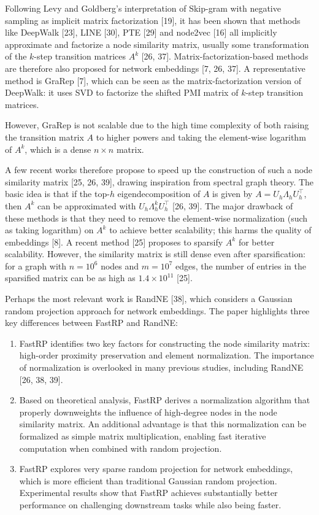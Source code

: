 \documentclass[11pt]{article}
\begin{document}
Following Levy and Goldberg's interpretation of Skip-gram with negative sampling as implicit matrix factorization [19], it has been shown that methods like DeepWalk [23], LINE [30], PTE [29] and node2vec [16] all implicitly approximate and factorize a node similarity matrix, usually some transformation of the $k$-step transition matrices $A^k$ [26, 37]. Matrix-factorization-based methods are therefore also proposed for network embeddings [7, 26, 37]. A representative method is GraRep [7], which can be seen as the matrix-factorization version of DeepWalk: it uses SVD to factorize the shifted PMI matrix of $k$-step transition matrices.

However, GraRep is not scalable due to the high time complexity of both raising the transition matrix $A$ to higher powers and taking the element-wise logarithm of $A^k$, which is a dense $n \times n$ matrix.

A few recent works therefore propose to speed up the construction of such a node similarity matrix [25, 26, 39], drawing inspiration from spectral graph theory. The basic idea is that if the top-$h$ eigendecomposition of $A$ is given by $A = U_h \Lambda_h U_h^\top$, then $A^k$ can be approximated with $U_h \Lambda_h^k U_h^\top$ [26, 39]. The major drawback of these methods is that they need to remove the element-wise normalization (such as taking logarithm) on $A^k$ to achieve better scalability; this harms the quality of embeddings [8]. A recent method [25] proposes to sparsify $A^k$ for better scalability. However, the similarity matrix is still dense even after sparsification: for a graph with $n=10^6$ nodes and $m=10^7$ edges, the number of entries in the sparsified matrix can be as high as $1.4 \times 10^{11}$ [25].

Perhaps the most relevant work is RandNE [38], which considers a Gaussian random projection approach for network embeddings. The paper highlights three key differences between FastRP and RandNE:
\begin{enumerate}[leftmargin=1.5em]
    \item FastRP identifies two key factors for constructing the node similarity matrix: high-order proximity preservation and element normalization. The importance of normalization is overlooked in many previous studies, including RandNE [26, 38, 39].
    \item Based on theoretical analysis, FastRP derives a normalization algorithm that properly downweights the influence of high-degree nodes in the node similarity matrix. An additional advantage is that this normalization can be formalized as simple matrix multiplication, enabling fast iterative computation when combined with random projection.
    \item FastRP explores very sparse random projection for network embeddings, which is more efficient than traditional Gaussian random projection. Experimental results show that FastRP achieves substantially better performance on challenging downstream tasks while also being faster.
\end{enumerate}
\end{document}
